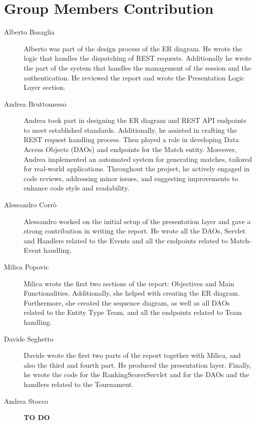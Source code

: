 \section{Group Members Contribution}

\begin{description}
	\item[Alberto Basaglia]
Alberto was part of the design process of the ER diagram.
He wrote the logic that handles the dispatching of REST requests.
Additionally he wrote the part of the system that handles the management of the session and the authentication.
He reviewed the report and wrote the Presentation Logic Layer section.
	\item[Andrea Bruttomesso]
Andrea took part in designing the ER diagram and REST API endpoints to meet established standards.
Additionally, he assisted in crafting the REST request handling process.
Then played a role in developing Data Access Objects (DAOs) and endpoints for the Match entity. Moreover, Andrea implemented an automated system for generating matches, tailored for real-world applications.
Throughout the project, he actively engaged in code reviews, addressing minor issues, and suggesting improvements to enhance code style and readability.
	\item[Alessandro Corrò]
Alessandro worked on the initial setup of the presentation layer and gave a strong contribution in writing the report.
He wrote all the DAOs, Servlet and Handlers related to the Events and all the endpoints related to Match-Event handling.
	\item[Milica Popovic]
Milica wrote the first two sections of the report: Objectives and Main Functionalities.
Additionally, she helped with creating the ER diagram.
Furthermore, she created the sequence diagram, as well as all DAOs related to the Entity Type Team, and all the endpoints related to Team handling.
	\item[Davide Seghetto]
Davide wrote the first two parts of the report together with Milica, and also the third and fourth part.
He produced the presentation layer. Finally, he wrote the code for the RankingScorerServlet and for the DAOs
and the handlers related to the Tournament.
	\item[Andrea Stocco] \textbf{TO DO}
\end{description}
